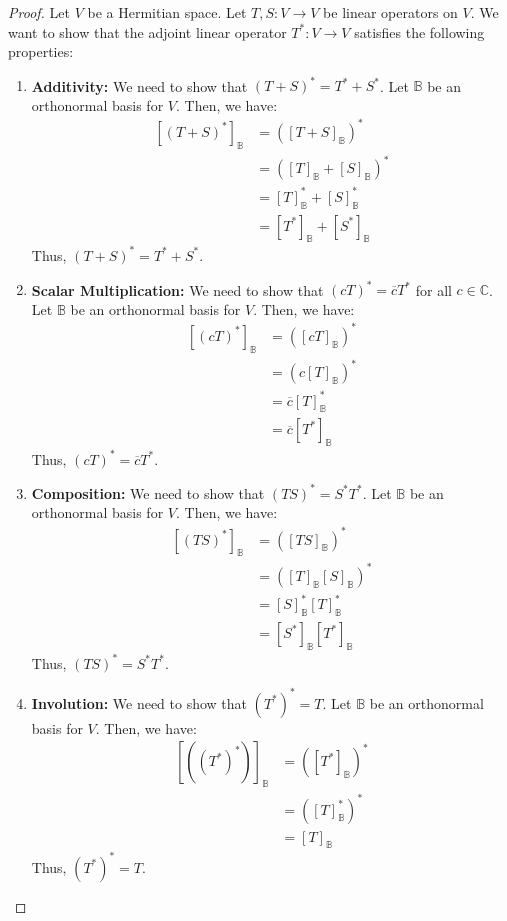 \documentclass[openany]{book}
\renewcommand{\C}{\mathbb{C}}
\begin{document}
\begin{proof}
Let $V$ be a Hermitian space. Let $T, S: V \to V$ be linear operators on $V$. We want to show that the adjoint linear operator $T^*: V \to V$ satisfies the following properties:
\begin{enumerate}
    \item \textbf{Additivity:} We need to show that $(T + S)^* = T^* + S^*$. Let $\mathbb{B}$ be an orthonormal basis for $V$. Then, we have:
    \[\begin{aligned}
    [(T + S)^*]_{\mathbb{B}} &= ([T + S]_{\mathbb{B}})^* \\
    &= ([T]_{\mathbb{B}} + [S]_{\mathbb{B}})^* \\
    &= [T]_{\mathbb{B}}^* + [S]_{\mathbb{B}}^* \\
    &= [T^*]_{\mathbb{B}} + [S^*]_{\mathbb{B}}
    \end{aligned}\]
    Thus, $(T + S)^* = T^* + S^*$.
    
    \item \textbf{Scalar Multiplication:} We need to show that $(cT)^* = \overline{c} T^*$ for all $c \in \C$. Let $\mathbb{B}$ be an orthonormal basis for $V$. Then, we have:
    \[\begin{aligned}
    [(cT)^*]_{\mathbb{B}} &= ([cT]_{\mathbb{B}})^* \\
    &= (c[T]_{\mathbb{B}})^* \\
    &= \overline{c} [T]_{\mathbb{B}}^* \\
    &= \overline{c} [T^*]_{\mathbb{B}}
    \end{aligned}\]
    Thus, $(cT)^* = \overline{c} T^*$.
    
    \item \textbf{Composition:} We need to show that $(TS)^* = S^* T^*$. Let $\mathbb{B}$ be an orthonormal basis for $V$. Then, we have:
    \[\begin{aligned}
    [(TS)^*]_{\mathbb{B}} &= ([TS]_{\mathbb{B}})^* \\
    &= ([T]_{\mathbb{B}} [S]_{\mathbb{B}})^* \\
    &= [S]_{\mathbb{B}}^* [T]_{\mathbb{B}}^* \\
    &= [S^*]_{\mathbb{B}} [T^*]_{\mathbb{B}}
    \end{aligned}\]
    Thus, $(TS)^* = S^* T^*$.
    
    \item \textbf{Involution:} We need to show that $(T^*)^* = T$. Let $\mathbb{B}$ be an orthonormal basis for $V$. Then, we have:
    \[\begin{aligned}
    [((T^*)^*)]_{\mathbb{B}} &= ([T^*]_{\mathbb{B}})^* \\
    &= ([T]_{\mathbb{B}}^*)^* \\
    &= [T]_{\mathbb{B}}
    \end{aligned}\]
    Thus, $(T^*)^* = T$.
\end{enumerate}
\end{proof}
\end{document}
